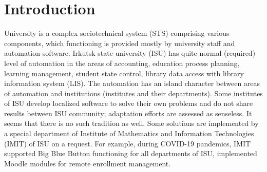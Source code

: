\documentclass[
]{ceurart}
\begin{document}
\maketitle


\section{Introduction}

University is a complex sociotechnical system (STS) \cite{zh2020} comprising various components, which functioning is provided mostly by university staff and automation software.  Irkutsk state university (ISU) has quite normal (required) level of automation in the areas of accounting, education process planning, learning management, student state control, library data access with library information system (LIS).  The automation has an island character between areas of automation and institutions (institutes and their departments).  Some institutes of ISU develop localized software to solve their own problems and do not share results between ISU community; adaptation efforts are assessed as senseless. It seems that there is no such tradition as well.  Some solutions are implemented by a special department of Institute of Mathematics and Information Technologies (IMIT) of ISU on a request.  For example, during COVID-19 pandemics, IMIT supported Big Blue Button functioning for all departments of ISU, implemented Moodle modules for remote enrollment management.

\end{document}

